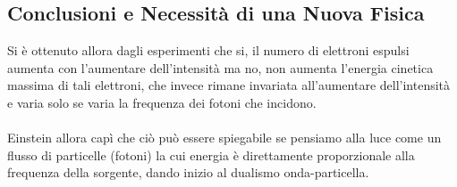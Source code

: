\subsection{Conclusioni e Necessità di una Nuova Fisica}

	Si è ottenuto allora dagli esperimenti che si, il numero di elettroni espulsi aumenta con l'aumentare dell'intensità ma no, non aumenta l'energia cinetica massima di tali elettroni, che invece rimane invariata all'aumentare dell'intensità e varia solo se varia la frequenza dei fotoni che incidono.
	\\
	\\
	Einstein allora capì che ciò può essere spiegabile se pensiamo alla luce come un flusso di particelle (fotoni) la cui energia è direttamente proporzionale alla frequenza della sorgente, dando inizio al dualismo onda-particella.
	
	
	
	
	
	
	
	
	
	
	
	
	
	
	